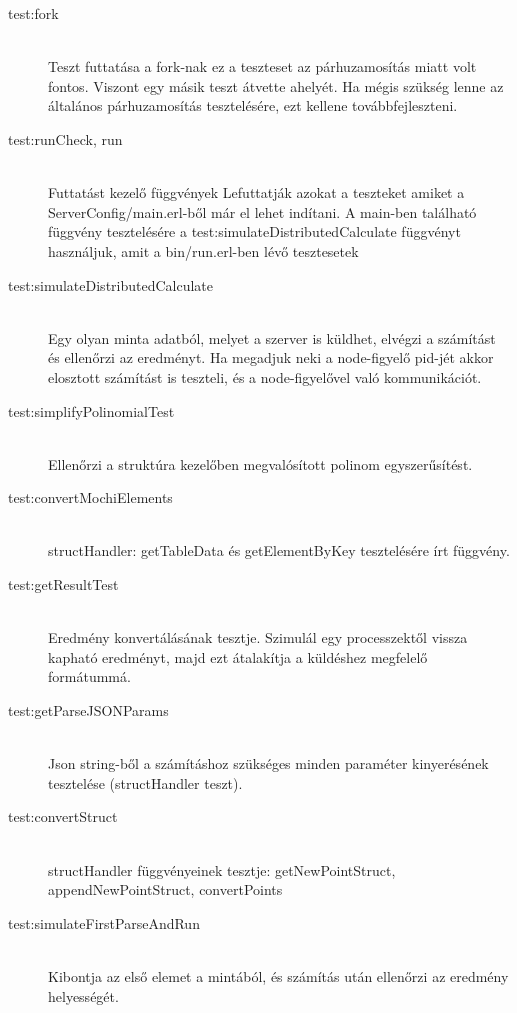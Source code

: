 		\begin{description}
		\item[test:fork] \hfill \\
			Teszt futtatása a fork-nak ez a teszteset az párhuzamosítás miatt volt fontos. Viszont egy másik teszt átvette  ahelyét. 
			\newline
			Ha mégis szükség lenne az általános párhuzamosítás tesztelésére, ezt kellene továbbfejleszteni.

		\item[test:runCheck, run] \hfill \\
			Futtatást kezelő függvények
			Lefuttatják azokat a teszteket amiket a ServerConfig/main.erl-ből már el lehet indítani. 
			A main-ben található függvény tesztelésére a  test:simulateDistributedCalculate függvényt használjuk, amit a bin/run.erl-ben lévő tesztesetek 
		\item[test:simulateDistributedCalculate] \hfill \\
			Egy olyan minta adatból, melyet a szerver is küldhet, elvégzi a számítást és ellenőrzi az eredményt. \newline
			Ha megadjuk neki a node-figyelő pid-jét akkor elosztott számítást is teszteli, és a node-figyelővel való kommunikációt. 
		\item[test:simplifyPolinomialTest] \hfill \\
			Ellenőrzi a struktúra kezelőben megvalósított polinom egyszerűsítést.  
		\item[test:convertMochiElements] \hfill \\
			structHandler: getTableData és getElementByKey tesztelésére írt függvény.
		\item[test:getResultTest] \hfill \\
			Eredmény konvertálásának tesztje. Szimulál egy processzektől vissza kapható eredményt, majd ezt átalakítja a küldéshez megfelelő formátummá.
		\item[test:getParseJSONParams] \hfill \\
			Json string-ből a számításhoz szükséges minden paraméter kinyerésének tesztelése (structHandler teszt).
		\item[test:convertStruct] \hfill \\
			structHandler függvényeinek tesztje: 
			getNewPointStruct, appendNewPointStruct, convertPoints
		\item[test:simulateFirstParseAndRun] \hfill \\
			Kibontja az első elemet a mintából, és számítás után ellenőrzi az eredmény helyességét. \newline

\end{description}
